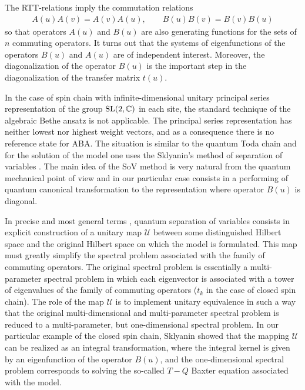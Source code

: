 \documentclass[pdftex]{sigma}
\numberwithin{equation}{section}
\begin{document}
The RTT-relations imply the commutation relations
\begin{align*}
A(u) A(v) = A(v) A(u), \qquad B(u) B(v) = B(v) B(u)
\end{align*}
so that operators $A(u)$ and $B(u)$ are also generating functions
for the sets of $n$ commuting operators.
It turns out that the systems of eigenfunctions of the operators
$B(u)$ and $A(u)$ are of independent interest.
Moreover, the diagonalization of the operator $B(u)$ is the important step in the diagonalization of the transfer matrix $t(u)$.

In the case of spin chain with infinite-dimensional unitary principal series representation of the group ${\rm SL}(2,\mathbb{C})$ in each site, the standard technique of
the algebraic Bethe ansatz \cite{F,KSk,FST} is not applicable.
The principal series representation has neither lowest nor highest weight vectors, and as a consequence there is no reference state for ABA.
The situation is similar to the quantum Toda chain and for the
solution of the model one uses the Sklyanin's method of
separation of variables \cite{KL1,KL2,KK, S1,S2}.
The main idea of the SoV method is very natural from the quantum
mechanical point of view and in our particular case consists in a performing
of quantum canonical transformation \cite{Fock2, Fock1} to the representation where operator $B(u)$ is diagonal.

In precise and most general terms \cite{KK, S1,S2}, quantum separation of variables
consists in explicit construction of a unitary map $\mathcal{U}$ between some
distinguished Hilbert space and the original Hilbert space on which the model is formulated. This map must greatly simplify the spectral problem associated with
the family of commuting operators.
The original spectral problem is essentially a multi-parameter spectral problem
in which each eigenvector is associated with a tower of eigenvalues of the
family of commuting operators
($t_k$ in the case of closed spin chain). The role of the map $\mathcal{U}$ is to implement unitary equivalence in such a way that the original multi-dimensional and multi-parameter spectral problem is reduced to a multi-parameter, but one-dimensional spectral problem.
In our particular example of the closed spin chain, Sklyanin showed
that the mapping $\mathcal{U}$ can be realized as an integral transformation,
where the integral kernel is given by an eigenfunction of the operator $B(u)$, and
the one-dimensional spectral problem corresponds to solving the so-called
$T-Q$ Baxter equation associated with the model.
\end{document}
